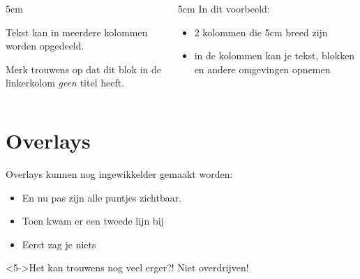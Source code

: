 \documentclass{beamer} %
\begin{document}
\begin{frame}{\secname}
  \begin{columns}
    \begin{column}[t]{5cm}
      \begin{block}{}
Tekst kan in meerdere kolommen worden opgedeeld.

Merk trouwens op dat dit blok in de linkerkolom \emph{geen} titel heeft.
      \end{block}
    \end{column}
    \pause
    \begin{column}[t]{5cm}
      In dit voorbeeld:
      \begin{itemize}
      \item 2 kolommen die 5cm breed zijn
      \item in de kolommen kan je tekst, blokken en andere omgevingen opnemen
      \end{itemize}
    \end{column}
  \end{columns}
\end{frame}


\section{Overlays}

\begin{frame}{\secname}
Overlays kunnen nog ingewikkelder gemaakt worden:
\begin{itemize}
\item<4-> En nu pas zijn alle puntjes zichtbaar.
\item<3-> Toen kwam er een tweede lijn bij
\item<2-> Eerst zag je niets
\end{itemize}

\begin{alertblock}<5->{Het kan trouwens nog veel erger?!}
Niet overdrijven!
\end{alertblock}
\end{frame}
\end{document}
